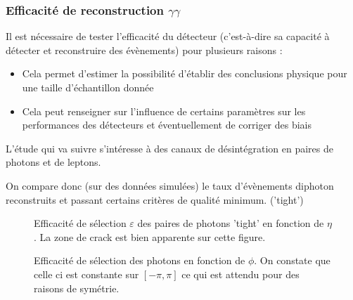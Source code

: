 \documentclass[11pt]{article} %
\begin{document}
\subsubsection{Efficacité de reconstruction $\gamma\gamma$}

Il est nécessaire de tester l'efficacité du détecteur (c'est-à-dire sa capacité à détecter et reconstruire des évènements) pour plusieurs raisons :

\begin{itemize}
\item{Cela permet d'estimer la possibilité d'établir des conclusions physique pour une taille d'échantillon donnée}
\item{Cela peut renseigner sur l'influence de certains paramètres sur les performances des détecteurs et éventuellement de corriger des biais}
\end{itemize}


L'étude qui va suivre s'intéresse à des canaux de désintégration en paires de photons et de leptons.

On compare donc (sur des données simulées) le taux d'évènements diphoton reconstruits et passant certains critères de qualité minimum. ('tight')

\begin{figure}[H]
\centering
  \caption{Efficacité de sélection $\varepsilon$ des paires de photons 'tight' en fonction de $\eta$. La zone de \og crack \fg est bien apparente sur cette figure. }
 \resizebox{.8\linewidth}{!}{}
\end{figure}


\begin{figure}[H]
\centering
  \caption{}
 \resizebox{.8\linewidth}{!}{}
  \caption{Efficacité de sélection des photons en fonction de $\phi$. On constate que celle ci est constante sur $[-\pi,\pi]$ ce qui est attendu pour des raisons de symétrie.}
\end{figure}
\end{document}
